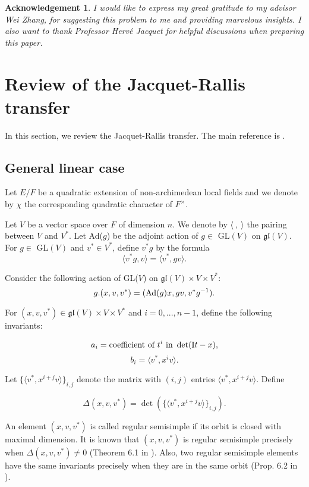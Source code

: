 \documentclass[11pt, oneside,reqno]{amsart}   	%
\newtheorem*{acknowledgement}{Acknowledgement}
\begin{document}
\begin{acknowledgement}
\textup{I would like to express my great gratitude to my advisor Wei Zhang, for suggesting this problem to me and providing marvelous insights. I also want to thank Professor Herv\'e Jacquet for helpful discussions when preparing this paper.}

 \end{acknowledgement}

\section{Review of the Jacquet-Rallis transfer} \label{JR review}

In this section, we review the Jacquet-Rallis transfer. The main reference is \cite{Rallis1}.

\subsection{General linear case}

Let $E/F$ be a quadratic extension of non-archimedean local fields and we denote by $\chi$ the corresponding quadratic character of $F^\times$.

Let $V$ be a vector space over $F$ of dimension $n$. We denote by $\langle \ ,  \ \rangle$ the pairing between $V$ and $V^*$. Let Ad($g$) be the adjoint action of $g\in$ GL$(V)$ on $\mathfrak{gl}(V)$. For  $g\in$ GL$(V)$ and $v^* \in V^*$, define $v^*g$ by the formula
$$\langle v^*g,v\rangle=\langle v^*,gv\rangle.$$

Consider the following action of GL($V$) on $\mathfrak{gl}(V)\times V\times V^*$:
$$g.(x,v,v^*)=(\textup{Ad}(g)x,gv,v^*g^{-1}).$$

For $(x,v,v^*) \in \mathfrak{gl}(V)\times V\times V^*$ and $i=0,...,n-1$, define the following invariants:

$$a_i=\textup{coefficient of }t^i \textup{ in } \det(\textup{I}t-x),$$
$$b_i=\langle v^*,x^iv\rangle.$$


Let $\{\langle v^*,x^{i+j}v\rangle\}_{i,j}$ denote the matrix with $(i,j)$ entries $\langle v^*,x^{i+j}v\rangle$. Define

$$\Delta(x,v,v^*)=\det(\{\langle v^*,x^{i+j}v\rangle\}_{i,j}).$$

An element $(x,v,v^*)$ is called regular semisimple if its orbit is closed with maximal dimension. It is known that $(x,v,v^*)$ is regular semisimple precisely when $\Delta(x,v,v^*) \neq 0$ (Theorem 6.1 in \cite{Rallis1}). Also, two regular semisimple elements have the same invariants precisely when they are in the same orbit (Prop. 6.2 in \cite{Rallis1}).
\end{document}
